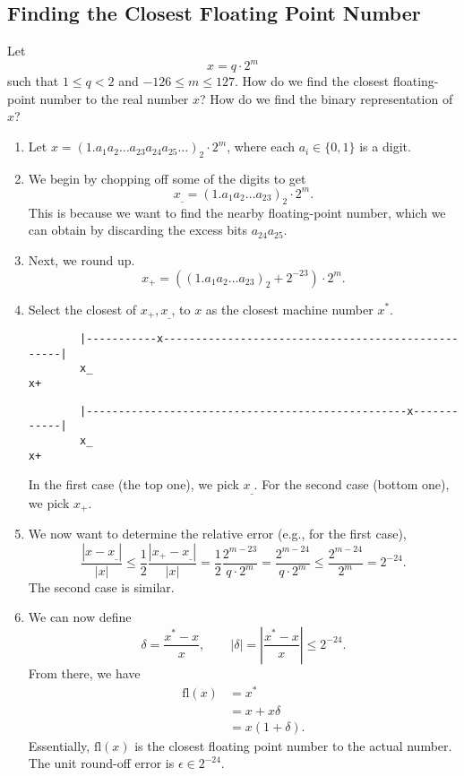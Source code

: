 \documentclass[letterpaper]{article}
\begin{document}
\subsection{Finding the Closest Floating Point Number}
Let \[x = q \cdot 2^m\] such that $1 \leq q < 2$ and $-126 \leq m \leq 127$. How do we find the closest floating-point number to the real number $x$? How do we find the binary representation of $x$? 
\begin{enumerate}
    \item Let $x = (1.a_1 a_2 \hdots a_{23} a_{24} a_{25} \hdots)_{2} \cdot 2^{m}$, where each $a_i \in \{0, 1\}$ is a digit.
    
    \item We begin by chopping off some of the digits to get 
    \[x_{\_} = (1.a_{1} a_{2} \hdots a_{23})_2 \cdot 2^m.\]
    This is because we want to find the nearby floating-point number, which we can obtain by discarding the excess bits $a_{24}a_{25}$. 

    \item Next, we round up. 
    \[x_{+} = ((1.a_1 a_2 \hdots a_{23})_2 + 2^{-23}) \cdot 2^m.\]

    \item Select the closest of $x_{+}, x_{\_}$, to $x$ as the closest machine number $x^*$.
    \begin{verbatim}
        |-----------x---------------------------------------------------|
        x_                                                              x+\end{verbatim}
    \begin{verbatim}
        |--------------------------------------------------x------------|
        x_                                                              x+\end{verbatim}
    In the first case (the top one), we pick $x_\_$. For the second case (bottom one), we pick $x_+$. 

    \item We now want to determine the relative error (e.g., for the first case),
    \[\frac{|x - x_\_|}{|x|} \leq \frac{1}{2} \frac{|x_+ - x_\_|}{|x|} = \frac{1}{2} \frac{2^{m - 23}}{q \cdot 2^m} = \frac{2^{m - 24}}{q \cdot 2^m} \leq \frac{2^{m - 24}}{2^m} = 2^{-24}.\]
    The second case is similar.

    \item We can now define 
    \[\delta = \frac{x^* - x}{x}, \qquad |\delta| = \left|\frac{x^* - x}{x}\right| \leq 2^{-24}.\]
    From there, we have 
    \[\begin{aligned}
        \text{fl}(x) &= x^* \\ 
            &= x + x\delta \\ 
            &= x(1 + \delta).
    \end{aligned}\]
    Essentially, $\text{fl}(x)$ is the closest floating point number to the actual number. The unit round-off error is $\epsilon \in 2^{-24}$.  
\end{enumerate}
\end{document}
